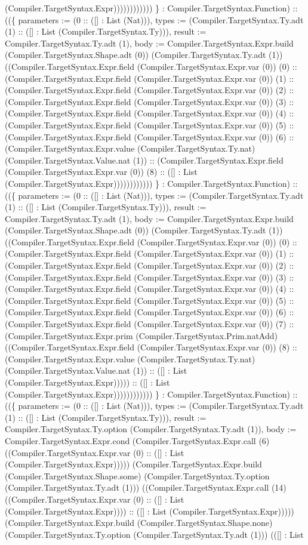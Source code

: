 \documentclass[11pt]{article}
\begin{document}
(Compiler.TargetSyntax.Expr)))))))))))) \} : Compiler.TargetSyntax.Function) :: ((\{ parameters := (0 :: ([] : List (Nat))), types := (Compiler.TargetSyntax.Ty.adt (1) :: ([] : List (Compiler.TargetSyntax.Ty))), result := Compiler.TargetSyntax.Ty.adt (1), body := Compiler.TargetSyntax.Expr.build (Compiler.TargetSyntax.Shape.adt (0)) (Compiler.TargetSyntax.Ty.adt (1)) ((Compiler.TargetSyntax.Expr.field (Compiler.TargetSyntax.Expr.var (0)) (0) :: (Compiler.TargetSyntax.Expr.field (Compiler.TargetSyntax.Expr.var (0)) (1) :: (Compiler.TargetSyntax.Expr.field (Compiler.TargetSyntax.Expr.var (0)) (2) :: (Compiler.TargetSyntax.Expr.field (Compiler.TargetSyntax.Expr.var (0)) (3) :: (Compiler.TargetSyntax.Expr.field (Compiler.TargetSyntax.Expr.var (0)) (4) :: (Compiler.TargetSyntax.Expr.field (Compiler.TargetSyntax.Expr.var (0)) (5) :: (Compiler.TargetSyntax.Expr.field (Compiler.TargetSyntax.Expr.var (0)) (6) :: (Compiler.TargetSyntax.Expr.value (Compiler.TargetSyntax.Ty.nat) (Compiler.TargetSyntax.Value.nat (1)) :: (Compiler.TargetSyntax.Expr.field (Compiler.TargetSyntax.Expr.var (0)) (8) :: ([] : List (Compiler.TargetSyntax.Expr)))))))))))) \} : Compiler.TargetSyntax.Function) :: ((\{ parameters := (0 :: ([] : List (Nat))), types := (Compiler.TargetSyntax.Ty.adt (1) :: ([] : List (Compiler.TargetSyntax.Ty))), result := Compiler.TargetSyntax.Ty.adt (1), body := Compiler.TargetSyntax.Expr.build (Compiler.TargetSyntax.Shape.adt (0)) (Compiler.TargetSyntax.Ty.adt (1)) ((Compiler.TargetSyntax.Expr.field (Compiler.TargetSyntax.Expr.var (0)) (0) :: (Compiler.TargetSyntax.Expr.field (Compiler.TargetSyntax.Expr.var (0)) (1) :: (Compiler.TargetSyntax.Expr.field (Compiler.TargetSyntax.Expr.var (0)) (2) :: (Compiler.TargetSyntax.Expr.field (Compiler.TargetSyntax.Expr.var (0)) (3) :: (Compiler.TargetSyntax.Expr.field (Compiler.TargetSyntax.Expr.var (0)) (4) :: (Compiler.TargetSyntax.Expr.field (Compiler.TargetSyntax.Expr.var (0)) (5) :: (Compiler.TargetSyntax.Expr.field (Compiler.TargetSyntax.Expr.var (0)) (6) :: (Compiler.TargetSyntax.Expr.field (Compiler.TargetSyntax.Expr.var (0)) (7) :: (Compiler.TargetSyntax.Expr.prim (Compiler.TargetSyntax.Prim.natAdd) ((Compiler.TargetSyntax.Expr.field (Compiler.TargetSyntax.Expr.var (0)) (8) :: (Compiler.TargetSyntax.Expr.value (Compiler.TargetSyntax.Ty.nat) (Compiler.TargetSyntax.Value.nat (1)) :: ([] : List (Compiler.TargetSyntax.Expr))))) :: ([] : List (Compiler.TargetSyntax.Expr)))))))))))) \} : Compiler.TargetSyntax.Function) :: ((\{ parameters := (0 :: ([] : List (Nat))), types := (Compiler.TargetSyntax.Ty.adt (1) :: ([] : List (Compiler.TargetSyntax.Ty))), result := Compiler.TargetSyntax.Ty.option (Compiler.TargetSyntax.Ty.adt (1)), body := Compiler.TargetSyntax.Expr.cond (Compiler.TargetSyntax.Expr.call (6) ((Compiler.TargetSyntax.Expr.var (0) :: ([] : List (Compiler.TargetSyntax.Expr))))) (Compiler.TargetSyntax.Expr.build (Compiler.TargetSyntax.Shape.some) (Compiler.TargetSyntax.Ty.option (Compiler.TargetSyntax.Ty.adt (1))) ((Compiler.TargetSyntax.Expr.call (14) ((Compiler.TargetSyntax.Expr.var (0) :: ([] : List (Compiler.TargetSyntax.Expr)))) :: ([] : List (Compiler.TargetSyntax.Expr))))) (Compiler.TargetSyntax.Expr.build (Compiler.TargetSyntax.Shape.none) (Compiler.TargetSyntax.Ty.option (Compiler.TargetSyntax.Ty.adt (1))) (([] : List 
\end{document}
